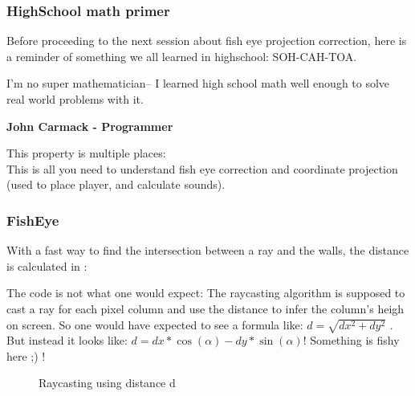 \subsubsection{HighSchool math primer}
Before proceeding to the next session about fish eye projection correction, here is a reminder of something we all learned in highschool: SOH-CAH-TOA.

 \begin{fancyquotes}
  I'm no super mathematician-- I learned high school math well enough to solve real world problems with it.\\
 \par
\textbf{John Carmack - Programmer}
 \end{fancyquotes}


\par
\begin{figure}[H]
\centering
 
\end{figure}

This property is multiple places:\\
This is all you need to understand fish eye correction and coordinate projection (used to place player, and calculate sounds).












\subsubsection{FishEye}
With a fast way to find the intersection between a ray and the walls, the distance is calculated in :\\

\begin{minipage}{\textwidth}

\end{minipage}

The code is not what one would expect: The raycasting algorithm is supposed to cast a ray for each pixel column and use the distance  to infer the column's heigh on screen. So one would have expected to see a formula like:
$ d = \sqrt{dx^2 + dy^2}$ . But instead it looks like: $d = dx * \cos(\alpha) - dy * \sin(\alpha) $! Something is fishy here ;) !\\
\par
\begin{figure}[H]
\centering
 
 \caption{Raycasting using distance d} \label{fig:Raycasting2}
\end{figure}

